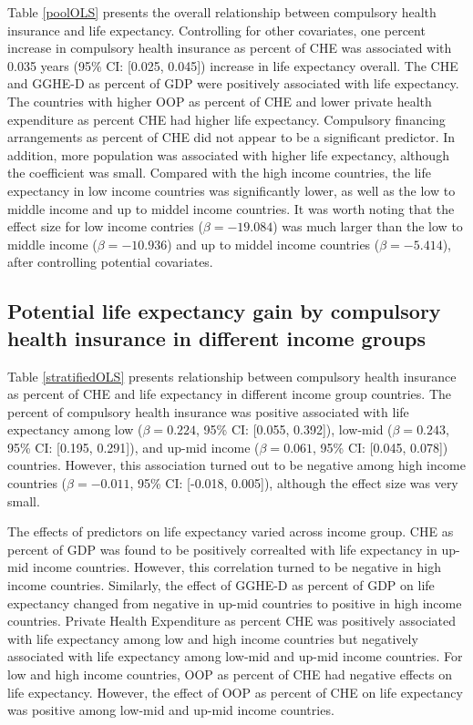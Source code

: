 \documentclass[]{elsarticle} %
\begin{document}
Table \ref{poolOLS} presents the overall relationship between compulsory health insurance and life expectancy. Controlling for other covariates, one percent increase in compulsory health insurance as percent of CHE was associated with 0.035 years (95\% CI: {[}0.025, 0.045{]}) increase in life expectancy overall. The CHE and GGHE-D as percent of GDP were positively associated with life expectancy. The countries with higher OOP as percent of CHE and lower private health expenditure as percent CHE had higher life expectancy. Compulsory financing arrangements as percent of CHE did not appear to be a significant predictor. In addition, more population was associated with higher life expectancy, although the coefficient was small. Compared with the high income countries, the life expectancy in low income countries was significantly lower, as well as the low to middle income and up to middel income countries. It was worth noting that the effect size for low income contries (\(\beta = -19.084\)) was much larger than the low to middle income (\(\beta = -10.936\)) and up to middel income countries (\(\beta = -5.414\)), after controlling potential covariates.

\hypertarget{potential-life-expectancy-gain-by-compulsory-health-insurance-in-different-income-groups}{%
\subsection{Potential life expectancy gain by compulsory health insurance in different income groups}\label{potential-life-expectancy-gain-by-compulsory-health-insurance-in-different-income-groups}}

Table \ref{stratifiedOLS} presents relationship between compulsory health insurance as percent of CHE and life expectancy in different income group countries. The percent of compulsory health insurance was positive associated with life expectancy among low (\(\beta = 0.224\), 95\% CI: {[}0.055, 0.392{]}), low-mid (\(\beta = 0.243\), 95\% CI: {[}0.195, 0.291{]}), and up-mid income (\(\beta = 0.061\), 95\% CI: {[}0.045, 0.078{]}) countries. However, this association turned out to be negative among high income countries (\(\beta = -0.011\), 95\% CI: {[}-0.018, 0.005{]}), although the effect size was very small.

The effects of predictors on life expectancy varied across income group. CHE as percent of GDP was found to be positively correalted with life expectancy in up-mid income countries. However, this correlation turned to be negative in high income countries. Similarly, the effect of GGHE-D as percent of GDP on life expectancy changed from negative in up-mid countries to positive in high income countries. Private Health Expenditure as percent CHE was positively associated with life expectancy among low and high income countries but negatively associated with life expectancy among low-mid and up-mid income countries. For low and high income countries, OOP as percent of CHE had negative effects on life expectancy. However, the effect of OOP as percent of CHE on life expectancy was positive among low-mid and up-mid income countries.
\end{document}
